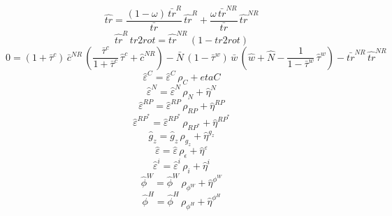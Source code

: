\begin{dmath}
{\hat{tr}}=\frac{\left(1-{\omega}\right)\, {\bar{tr}^{R}}}{{\bar{tr}}}\, {\hat{tr}^R}+\frac{{\omega}\, {\bar{tr}^{NR}}}{{\bar{tr}}}\, {\hat{tr}^{NR}}
\end{dmath}
\begin{dmath}
{\hat{tr}^R}\, {tr2rot}={\hat{tr}^{NR}}\, \left(1-{tr2rot}\right)
\end{dmath}
\begin{dmath}
0=\left(1+{\bar{\tau}^c}\right)\, {\bar{c}^{NR}}\, \left(\frac{{\bar{\tau}^c}}{1+{\bar{\tau}^c}}\, {\hat{\tau}^c}+{\hat{c}^{NR}}\right)-{\bar{N}}\, \left(1-{\bar{\tau}^w}\right)\, {\bar{w}}\, \left({\hat{w}}+{\hat{N}}-\frac{1}{1-{\bar{\tau}^w}}\, {\hat{\tau}^w}\right)-{\bar{tr}^{NR}}\, {\hat{tr}^{NR}}
\end{dmath}
\begin{dmath}
{\hat{\varepsilon}^C}={\hat{\varepsilon}^C}\, {\rho_{C}}+{etaC}
\end{dmath}
\begin{dmath}
{\hat{\varepsilon}^N}={\hat{\varepsilon}^N}\, {\rho_{N}}+{\hat{\eta}^{N}}
\end{dmath}
\begin{dmath}
{\hat{\varepsilon}^{RP}}={\hat{\varepsilon}^{RP}}\, {\rho_{RP}}+{\hat{\eta}^{RP}}
\end{dmath}
\begin{dmath}
{\hat{\varepsilon}^{RP^*}}={\hat{\varepsilon}^{RP^*}}\, {\rho_{RP^*}}+{\hat{\eta}^{RP^*}}
\end{dmath}
\begin{dmath}
{\hat{g}_z}={\hat{g}_z}\, {\rho_{g_z}}+{\hat{\eta}^{g_z}}
\end{dmath}
\begin{dmath}
{\hat{\varepsilon}}={\hat{\varepsilon}}\, {\rho_{\epsilon}}+{\hat{\eta}^{\varepsilon}}
\end{dmath}
\begin{dmath}
{\hat{\varepsilon}^i}={\hat{\varepsilon}^i}\, {\rho_{i}}+{\hat{\eta}^{i}}
\end{dmath}
\begin{dmath}
{\hat{\phi}^W}={\hat{\phi}^W}\, {\rho_{\phi^W}}+{\hat{\eta}^{\phi^W}}
\end{dmath}
\begin{dmath}
{\hat{\phi}^H}={\hat{\phi}^H}\, {\rho_{\phi^H}}+{\hat{\eta}^{\phi^H}}
\end{dmath}
